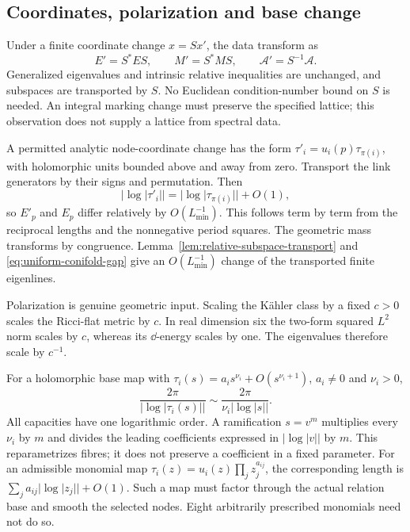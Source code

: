 \subsection{Coordinates, polarization and base change}

Under a finite coordinate change $x=Sx'$,
the data transform as
\[
 E'=S^*ES,\qquad M'=S^*MS,\qquad
                       \mathcal A'=S^{-1}\mathcal A.
\]
Generalized eigenvalues and intrinsic
relative inequalities are unchanged,
and subspaces are transported by $S$.
No Euclidean condition-number bound on
$S$ is needed. An integral marking
change must preserve the specified
lattice; this observation does not
supply a lattice from spectral data.

A permitted analytic node-coordinate
change has the form
$\tau'_i=u_i(p)\tau_{\pi(i)}$,
with holomorphic units bounded above
and away from zero. Transport the
link generators by their signs and
permutation. Then
\[
 |\log|\tau'_i||=|\log|\tau_{\pi(i)}||+O(1),
\]
so $E'_p$ and $E_p$ differ relatively
by $O(L_{\min}^{-1})$. This follows
term by term from the reciprocal
lengths and the nonnegative period
squares. The geometric mass transforms
by congruence.
Lemma~\ref{lem:relative-subspace-transport}
and \eqref{eq:uniform-conifold-gap}
give an $O(L_{\min}^{-1})$ change of
the transported finite eigenlines.

Polarization is genuine geometric
input. Scaling the Kähler class by
a fixed $c>0$ scales the Ricci-flat
metric by $c$. In real dimension six
the two-form squared $L^2$ norm scales
by $c$, whereas its $\dd$-energy
scales by one. The eigenvalues
therefore scale by $c^{-1}$.

For a holomorphic base map with
$\tau_i(s)=a_is^{\nu_i}+O(s^{\nu_i+1})$,
$a_i\ne0$ and $\nu_i>0$,
\begin{equation}\label{eq:holomorphic-arc-capacity}
 \frac{2\pi}{|\log|\tau_i(s)||}
       \sim\frac{2\pi}{\nu_i|\log|s||}.
\end{equation}
All capacities have one logarithmic
order. A ramification $s=v^m$ multiplies
every $\nu_i$ by $m$ and divides the
leading coefficients expressed in
$|\log|v||$ by $m$. This reparametrizes
fibres; it does not preserve a
coefficient in a fixed parameter.
For an admissible monomial map
$\tau_i(z)=u_i(z)\prod_jz_j^{a_{ij}}$,
the corresponding length is
$\sum_ja_{ij}|\log|z_j||+O(1)$.
Such a map must factor through the
actual relation base and smooth
the selected nodes. Eight arbitrarily
prescribed monomials need not do so.
